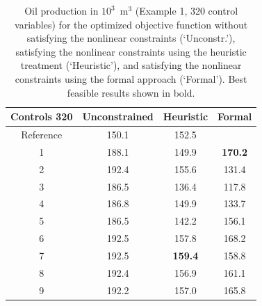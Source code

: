 \documentclass[twocolumn,numbook]{svjour3}          %
\begin{document}
             
\begin{table}
\centering
\caption{Oil production in $10^3$~m$^3$ (Example 1, 320 control variables) for the optimized objective function
         without satisfying the nonlinear constraints (`Unconstr.'), satisfying the nonlinear constraints
         using the heuristic treatment (`Heuristic'), and satisfying the nonlinear constraints
         using the formal approach (`Formal'). Best feasible results shown in bold.}
\begin{tabular}{|c|c|c|c|}
\hline
  Controls 320  & Unconstrained & Heuristic & Formal                          \\
\hline
Reference             & 150.1         &  152.5                      &                     \\
1                     & 188.1         &  149.9                      &  \bf{ 170.2 }        \\
2                     & 192.4         &  155.6                      &         131.4            \\
3                     & 186.5         &  136.4                      &         117.8          \\
4                     & 186.8         &  149.9                      &         133.7          \\
5                     & 186.5         &  142.2                      &         156.1          \\
6                     & 192.5         &  157.8                      &         168.2          \\
7                     & 192.5         &  \bf{159.4}               &         158.8          \\ 
8                     & 192.4         &  156.9                      &         161.1          \\
9                     & 192.2         &  157.0                      &         165.8          \\
\hline
\end{tabular}
  \label{table:PiC500Steps64}
\end{table}
 
 
 
\end{document}
